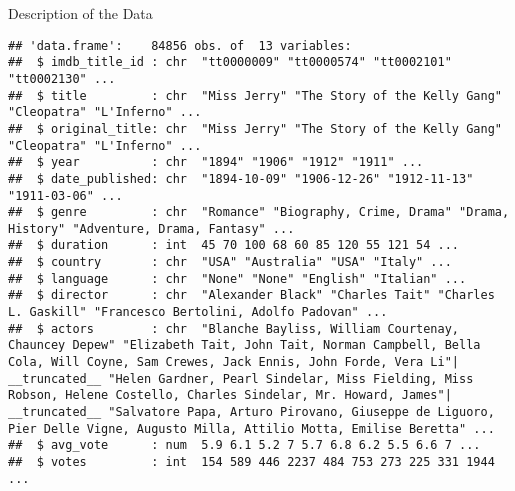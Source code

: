 \documentclass[
  ignorenonframetext,
]{beamer}
\begin{document}
\begin{frame}[fragile]{Description of the Data}
\begin{verbatim}
## 'data.frame':    84856 obs. of  13 variables:
##  $ imdb_title_id : chr  "tt0000009" "tt0000574" "tt0002101" "tt0002130" ...
##  $ title         : chr  "Miss Jerry" "The Story of the Kelly Gang" "Cleopatra" "L'Inferno" ...
##  $ original_title: chr  "Miss Jerry" "The Story of the Kelly Gang" "Cleopatra" "L'Inferno" ...
##  $ year          : chr  "1894" "1906" "1912" "1911" ...
##  $ date_published: chr  "1894-10-09" "1906-12-26" "1912-11-13" "1911-03-06" ...
##  $ genre         : chr  "Romance" "Biography, Crime, Drama" "Drama, History" "Adventure, Drama, Fantasy" ...
##  $ duration      : int  45 70 100 68 60 85 120 55 121 54 ...
##  $ country       : chr  "USA" "Australia" "USA" "Italy" ...
##  $ language      : chr  "None" "None" "English" "Italian" ...
##  $ director      : chr  "Alexander Black" "Charles Tait" "Charles L. Gaskill" "Francesco Bertolini, Adolfo Padovan" ...
##  $ actors        : chr  "Blanche Bayliss, William Courtenay, Chauncey Depew" "Elizabeth Tait, John Tait, Norman Campbell, Bella Cola, Will Coyne, Sam Crewes, Jack Ennis, John Forde, Vera Li"| __truncated__ "Helen Gardner, Pearl Sindelar, Miss Fielding, Miss Robson, Helene Costello, Charles Sindelar, Mr. Howard, James"| __truncated__ "Salvatore Papa, Arturo Pirovano, Giuseppe de Liguoro, Pier Delle Vigne, Augusto Milla, Attilio Motta, Emilise Beretta" ...
##  $ avg_vote      : num  5.9 6.1 5.2 7 5.7 6.8 6.2 5.5 6.6 7 ...
##  $ votes         : int  154 589 446 2237 484 753 273 225 331 1944 ...
\end{verbatim}
\end{frame}
\end{document}
